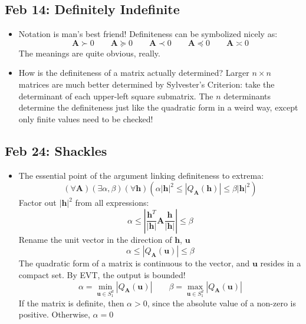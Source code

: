 \documentclass[10pt, oneside]{article}
\let\leq\leqslant
\renewcommand{\vec}[1]{\mathbf{#1}}
\newcommand{\mat}[1]{\mathbf{#1}}
\begin{document}
\subsection{Feb 14: Definitely Indefinite}
\begin{itemize}
    \item Notation is man's best friend! Definiteness can be symbolized nicely as:
        \[\mat{A} \succ 0 \quad \quad \mat{A} \succcurlyeq 0 \quad \quad \mat{A} \prec 0 \quad \quad \mat{A} \preccurlyeq 0 \quad \quad \mat{A} \asymp 0\]
        The meanings are quite obvious, really.
    \item How is the definiteness of a matrix actually determined?  Larger $n\times n$ matrices are much better determined by Sylvester's Criterion: take the determinant of each upper-left square submatrix. The $n$ determinants determine the definiteness just like the quadratic form in a weird way, except only finite values need to be checked!
\end{itemize}

\subsection{Feb 24: Shackles}
\begin{itemize}
    \item The essential point of the argument linking definiteness to extrema:
        \[(\forall \mat{A})(\exists \alpha, \beta)(\forall \vec{h})\left( \alpha|\vec{h}|^2 \leq |Q_\mat{A}(\vec{h})| \leq \beta |\vec{h}|^2 \right)\]
        Factor out $|\vec{h}|^2$ from all expressions:
        \[\alpha \leq \left| \frac{\vec{h}^T}{|\vec{h}|} \mat{A} \frac{\vec{h}}{|\vec{h}|} \right| \leq \beta\]
        Rename the unit vector in the direction of $\vec{h}$, $\vec{u}$
        \[\alpha \leq |Q_\mat{A} (\vec{u})| \leq \beta\]
        The quadratic form of a matrix is continuous to the vector, and $\vec{u}$ resides in a compact set. By EVT, the output is bounded!
        \[\alpha = \min_{\vec{u} \in S^d_1} |Q_\mat{A} (\vec{u})| \quad \quad \beta = \max_{\vec{u} \in S^d_1} |Q_\mat{A} (\vec{u})|\]
        If the matrix is definite, then $\alpha > 0$, since the absolute value of a non-zero is positive. Otherwise, $\alpha = 0$
\end{itemize}
\end{document}
